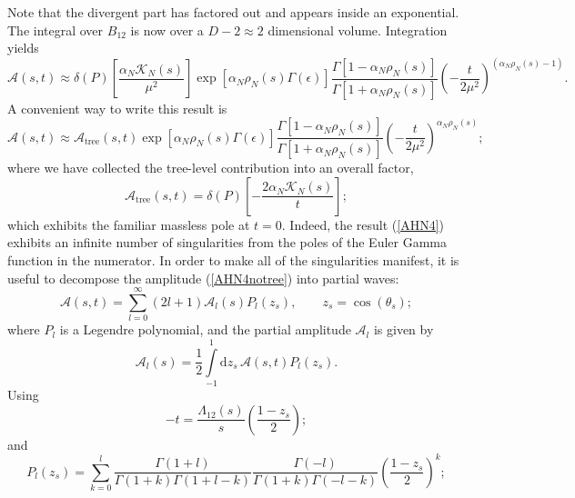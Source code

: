 Note that the divergent part has factored out and appears inside an exponential. The integral over $B_{12}$ is now over a $D - 2 \approx 2$ dimensional volume. Integration yields
\begin{equation}
	\mathcal{A}(s, t) \approx \delta(P) \left[ \frac{\alpha_{N} \mathcal{K}_{N}(s)}{\mu^{2}} \right] \exp{\left[ \alpha_{N} \rho_{N}(s) \Gamma(\epsilon) \right]} \frac{\Gamma[1 - \alpha_{N} \rho_{N}(s)]}{\Gamma[1 + \alpha_{N} \rho_{N}(s)]} \left( - \frac{t}{2 \mu^{2}} \right)^{(\alpha_{N} \rho_{N}(s) - 1)}.
	\label{AHN4notree}
\end{equation}
A convenient way to write this result is
\begin{equation}
	\mathcal{A}(s, t) \approx \mathcal{A}_{\text{tree}}(s, t) \exp{\left[ \alpha_{N} \rho_{N}(s) \Gamma(\epsilon) \right]} \frac{\Gamma[1 - \alpha_{N} \rho_{N}(s)]}{\Gamma[1 + \alpha_{N} \rho_{N}(s)]} \left( - \frac{t}{2 \mu^{2}} \right)^{\alpha_{N} \rho_{N}(s)};
	\label{AHN4}
\end{equation}
where we have collected the tree-level contribution into an overall factor,
\begin{equation}
	\mathcal{A}_{\text{tree}}(s, t) = \delta(P) \left[ - \frac{2 \alpha_{N} \mathcal{K}_{N}(s)}{t} \right];
\end{equation}
which exhibits the familiar massless pole at $t = 0$. Indeed, the result (\ref{AHN4}) exhibits an infinite number of singularities from the poles of the Euler Gamma function in the numerator. In order to make all of the singularities manifest, it is useful to decompose the amplitude (\ref{AHN4notree}) into partial waves:
\begin{equation}
	\mathcal{A}(s, t) = \sum_{l = 0}^{\infty} (2l + 1) \mathcal{A}_{l}(s) P_{l}(z_{s}), \qquad z_{s} = \cos{(\theta_{s})};
\end{equation}
where $P_{l}$ is a Legendre polynomial, and the partial amplitude $\mathcal{A}_{l}$ is given by
\begin{equation}
	\mathcal{A}_{l}(s) = \frac{1}{2} \int\limits_{-1}^{1} \mathrm{d}z_{s} \, \mathcal{A}(s, t) P_{l}(z_{s}).
\end{equation}
Using
\begin{equation}
	{-t} = \frac{\Lambda_{12}(s)}{s} \left( \frac{1 - z_{s}}{2} \right);
\end{equation}
and
\begin{equation}
	P_{l}(z_{s}) = \sum_{k = 0}^{l} \frac{\Gamma(1 + l)}{\Gamma(1 + k) \Gamma(1 + l - k)} \frac{\Gamma(-l)}{\Gamma(1 + k) \Gamma(-l-k)} \left( \frac{1 - z_{s}}{2} \right)^{k};
\end{equation}
